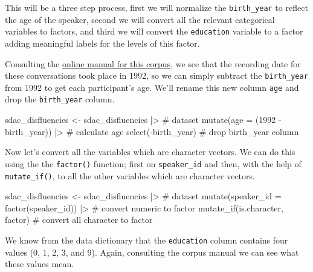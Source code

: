\documentclass[
  letterpaper,
]{latex/krantz}
\newenvironment{Shaded}{\begin{snugshade}}{\end{snugshade}}
\newcommand{\AttributeTok}[1]{\textcolor[rgb]{0.40,0.45,0.13}{#1}}
\newcommand{\CommentTok}[1]{\textcolor[rgb]{0.37,0.37,0.37}{#1}}
\newcommand{\DecValTok}[1]{\textcolor[rgb]{0.68,0.00,0.00}{#1}}
\newcommand{\FunctionTok}[1]{\textcolor[rgb]{0.28,0.35,0.67}{#1}}
\newcommand{\NormalTok}[1]{\textcolor[rgb]{0.00,0.23,0.31}{#1}}
\newcommand{\OtherTok}[1]{\textcolor[rgb]{0.00,0.23,0.31}{#1}}
\newcommand{\SpecialCharTok}[1]{\textcolor[rgb]{0.37,0.37,0.37}{#1}}
\begin{document}
This will be a three step process, first we will normalize the
\texttt{birth\_year} to reflect the age of the speaker, second we will
convert all the relevant categorical variables to factors, and third we
will convert the \texttt{education} variable to a factor adding
meaningful labels for the levels of this factor.

Consulting the
\href{https://catalog.ldc.upenn.edu/docs/LDC97S62/swb1_manual.txt}{online
manual for this corpus}, we see that the recording date for these
conversations took place in 1992, so we can simply subtract the
\texttt{birth\_year} from 1992 to get each participant's age. We'll
rename this new column \texttt{age} and drop the \texttt{birth\_year}
column.

\begin{Shaded}
\begin{Highlighting}[]
\NormalTok{sdac\_disfluencies }\OtherTok{\textless{}{-}} 
\NormalTok{  sdac\_disfluencies }\SpecialCharTok{|\textgreater{}} \CommentTok{\# dataset}
  \FunctionTok{mutate}\NormalTok{(}\AttributeTok{age =}\NormalTok{ (}\DecValTok{1992} \SpecialCharTok{{-}}\NormalTok{ birth\_year)) }\SpecialCharTok{|\textgreater{}} \CommentTok{\# calculate age}
  \FunctionTok{select}\NormalTok{(}\SpecialCharTok{{-}}\NormalTok{birth\_year) }\CommentTok{\# drop \textasciigrave{}birth\_year\textasciigrave{} column}
\end{Highlighting}
\end{Shaded}

Now let's convert all the variables which are character vectors. We can
do this using the the \texttt{factor()} function; first on
\texttt{speaker\_id} and then, with the help of \texttt{mutate\_if()},
to all the other variables which are character vectors.

\begin{Shaded}
\begin{Highlighting}[]
\NormalTok{sdac\_disfluencies }\OtherTok{\textless{}{-}} 
\NormalTok{  sdac\_disfluencies }\SpecialCharTok{|\textgreater{}} \CommentTok{\# dataset}
  \FunctionTok{mutate}\NormalTok{(}\AttributeTok{speaker\_id =} \FunctionTok{factor}\NormalTok{(speaker\_id)) }\SpecialCharTok{|\textgreater{}} \CommentTok{\# convert numeric to factor}
  \FunctionTok{mutate\_if}\NormalTok{(is.character, factor) }\CommentTok{\# convert all character to factor}
\end{Highlighting}
\end{Shaded}

We know from the data dictionary that the \texttt{education} column
contains four values (0, 1, 2, 3, and 9). Again, consulting the corpus
manual we can see what these values mean.
\end{document}
